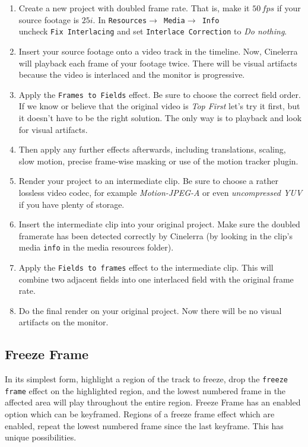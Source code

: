 \begin{enumerate}
    \item Create a new project with doubled frame rate. That is, make it $50\,fps$ if your source footage is $25i$. 
    In \texttt{Resources$\rightarrow$ Media$\rightarrow$ Info} \\ uncheck \texttt{Fix Interlacing} and set \texttt{Interlace Correction} to \textit{Do nothing}.
    \item Insert your source footage onto a video track in the timeline. Now, Cinelerra will playback each
    frame of your footage twice. There will be visual artifacts because the video is interlaced and the
    monitor is progressive.
    \item Apply the \texttt{Frames to Fields} effect. Be sure to choose the correct field order. If we know or believe that the original video is \textit{Top First} let's try it first, but it doesn't have to be the right solution. The only way is to playback and look for visual artifacts.
    \item Then apply any further effects afterwards, including translations, scaling, slow motion, precise
    frame-wise masking or use of the motion tracker plugin.
    \item Render your project to an intermediate clip. Be sure to choose a rather lossless video codec, for
    example \textit{Motion-JPEG-A} or even \textit{uncompressed YUV} if you have plenty of storage.
    \item Insert the intermediate clip into your original project. Make sure the doubled framerate has been
    detected correctly by Cinelerra (by looking in the clip's media \texttt{info} in the media resources folder).
    \item Apply the \texttt{Fields to frames} effect to the intermediate clip. This will combine two adjacent fields
    into one interlaced field with the original frame rate.
    \item Do the final render on your original project. Now there will be no visual artifacts on the monitor.
\end{enumerate}

\subsection{Freeze Frame}%
\label{sub:freeze_frame}

In its simplest form, highlight a region of the track to freeze, drop the \texttt{freeze frame} effect on the highlighted region, and the lowest numbered frame in the affected area will play throughout the entire region. Freeze Frame has an enabled option which can be keyframed. Regions of a freeze frame effect which are enabled, repeat the lowest numbered frame since the last keyframe. This has unique possibilities.


